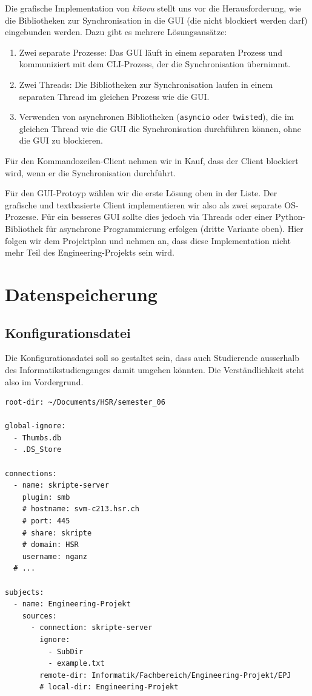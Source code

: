 \documentclass[a4paper]{article}
\let\oldsection\section
\renewcommand\section{\clearpage\oldsection}
\begin{document}
Die grafische Implementation von \emph{kitovu} stellt uns vor die Herausforderung, wie die Bibliotheken zur Synchronisation in die GUI (die nicht blockiert werden darf) eingebunden werden. Dazu gibt es mehrere Lösungsansätze:

\begin{enumerate}
	\item Zwei separate Prozesse: Das GUI läuft in einem separaten Prozess und kommuniziert mit dem CLI-Prozess, der die Synchronisation übernimmt.
	\item Zwei Threads: Die Bibliotheken zur Synchronisation laufen in einem separaten Thread im gleichen Prozess wie die GUI.
	\item Verwenden von asynchronen Bibliotheken (\verb|asyncio| oder \verb|twisted|), die im gleichen Thread wie die GUI die Synchronisation durchführen können, ohne die GUI zu blockieren.
\end{enumerate}

Für den Kommandozeilen-Client nehmen wir in Kauf, dass der Client blockiert wird, wenn er die Synchronisation durchführt.

Für den GUI-Protoyp wählen wir die erste Lösung oben in der Liste. Der grafische und textbasierte Client implementieren wir also als zwei separate OS-Prozesse. Für ein besseres GUI sollte dies jedoch via Threads oder einer Python-Bibliothek für asynchrone Programmierung erfolgen (dritte Variante oben). Hier folgen wir dem Projektplan und nehmen an, dass diese Implementation nicht mehr Teil des Engineering-Projekts sein wird.

\section{Datenspeicherung}

\subsection{Konfigurationsdatei}
Die Konfigurationsdatei soll so gestaltet sein, dass auch Studierende ausserhalb des Informatikstudienganges damit umgehen könnten. Die Verständlichkeit steht also im Vordergrund.

\begin{verbatim}
root-dir: ~/Documents/HSR/semester_06

global-ignore:
  - Thumbs.db
  - .DS_Store

connections:
  - name: skripte-server
    plugin: smb
    # hostname: svm-c213.hsr.ch
    # port: 445
    # share: skripte
    # domain: HSR
    username: nganz
  # ...

subjects:
  - name: Engineering-Projekt
    sources:
      - connection: skripte-server
        ignore:
          - SubDir
          - example.txt
        remote-dir: Informatik/Fachbereich/Engineering-Projekt/EPJ
        # local-dir: Engineering-Projekt
\end{verbatim}
\end{document}
